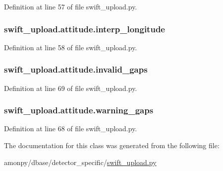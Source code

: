 Definition at line 57 of file swift\-\_\-upload.\-py.

\hypertarget{classswift__upload_1_1attitude_acc0cf2dc8573ea6cebf0e3fd83df6dd7}{
\subsubsection[{interp\-\_\-longitude}]{\setlength{\rightskip}{0pt plus 5cm}swift\-\_\-upload.\-attitude.\-interp\-\_\-longitude}}\label{classswift__upload_1_1attitude_acc0cf2dc8573ea6cebf0e3fd83df6dd7}


Definition at line 58 of file swift\-\_\-upload.\-py.

\hypertarget{classswift__upload_1_1attitude_a7e94e961a197f72b4ce146a86101e25b}{
\subsubsection[{invalid\-\_\-gaps}]{\setlength{\rightskip}{0pt plus 5cm}swift\-\_\-upload.\-attitude.\-invalid\-\_\-gaps}}\label{classswift__upload_1_1attitude_a7e94e961a197f72b4ce146a86101e25b}


Definition at line 69 of file swift\-\_\-upload.\-py.

\hypertarget{classswift__upload_1_1attitude_a8644c4ef3043a6ed4173a22a158855c5}{
\subsubsection[{warning\-\_\-gaps}]{\setlength{\rightskip}{0pt plus 5cm}swift\-\_\-upload.\-attitude.\-warning\-\_\-gaps}}\label{classswift__upload_1_1attitude_a8644c4ef3043a6ed4173a22a158855c5}


Definition at line 68 of file swift\-\_\-upload.\-py.



The documentation for this class was generated from the following file\-:\begin{DoxyCompactItemize}
\item 
amonpy/dbase/detector\-\_\-specific/\hyperlink{swift__upload_8py}{swift\-\_\-upload.\-py}\end{DoxyCompactItemize}
